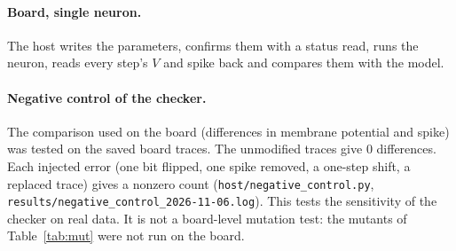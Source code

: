\documentclass[11pt]{article}
\begin{document}
\paragraph{Board, single neuron.}
The host writes the parameters, confirms them with a status read, runs the neuron, reads every step's $V$ and spike back and compares them with the model.

\paragraph{Negative control of the checker.} The comparison used on the board (differences in membrane potential and spike) was tested on the saved board traces. The unmodified traces give 0 differences. Each injected error (one bit flipped, one spike removed, a one-step shift, a replaced trace) gives a nonzero count (\texttt{host/negative\_control.py}, \texttt{results/\allowbreak negative\_control\allowbreak\_2026-11-06.log}). This tests the sensitivity of the checker on real data. It is not a board-level mutation test: the mutants of Table~\ref{tab:mut} were not run on the board.
\end{document}
